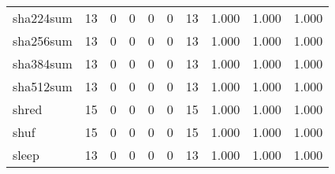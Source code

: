 \begin{longtable}{lp{1.3cm}p{1.3cm}p{1.3cm}p{1.3cm}p{1.3cm}p{1.3cm}p{1.3cm}p{1.3cm}p{1.3cm}}
sha224sum &                     13 &                                             0 &                                            0 &                                           0 &                                            0 &                                         13 &                                1.000 &                                  1.000 &                                1.000 \\
sha256sum &                     13 &                                             0 &                                            0 &                                           0 &                                            0 &                                         13 &                                1.000 &                                  1.000 &                                1.000 \\
sha384sum &                     13 &                                             0 &                                            0 &                                           0 &                                            0 &                                         13 &                                1.000 &                                  1.000 &                                1.000 \\
sha512sum &                     13 &                                             0 &                                            0 &                                           0 &                                            0 &                                         13 &                                1.000 &                                  1.000 &                                1.000 \\
shred     &                     15 &                                             0 &                                            0 &                                           0 &                                            0 &                                         15 &                                1.000 &                                  1.000 &                                1.000 \\
shuf      &                     15 &                                             0 &                                            0 &                                           0 &                                            0 &                                         15 &                                1.000 &                                  1.000 &                                1.000 \\
sleep     &                     13 &                                             0 &                                            0 &                                           0 &                                            0 &                                         13 &                                1.000 &                                  1.000 &                                1.000 \\

\end{longtable}
